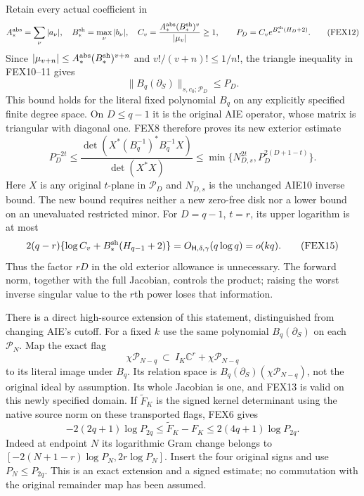 \documentclass[11pt,a4paper]{article}
\begin{document}
Retain every actual coefficient in
\[
 A_*^{\rm abs}=\sum_\nu|a_\nu|,\quad B_*^{\rm sh}=\max_\nu|b_\nu|,
 \quad C_v=\frac{A_*^{\rm abs}(B_*^{\rm sh})^v}{|\mu_v|}\ge1,
 \qquad P_D=C_v e^{B_*^{\rm sh}(H_D+2)}.
 \tag{FEX12}
\]
Since $|\mu_{v+n}|\le A_*^{\rm abs}(B_*^{\rm sh})^{v+n}$ and
$v!/(v+n)!\le1/n!$, the triangle inequality in FEX10--11 gives
\[
 \|B_q(\partial_S)\|_{s,c_0;\mathcal P_D}\le P_D.
 \tag{FEX13}
\]
This bound holds for the literal fixed polynomial $B_q$ on any explicitly
specified finite degree space. On $D\le q-1$ it is the original AIE
operator, whose matrix is triangular with diagonal one. FEX8 therefore
proves its new exterior estimate
\[
\boxed{\quad
 P_D^{-2t}\le
 \frac{\det(X^*(B_q^{-1})^*B_q^{-1}X)}{\det(X^*X)}
 \le \min\{N_{D,s}^{2t},P_D^{2(D+1-t)}\}.
 \quad}\tag{FEX14}
\]
Here $X$ is any original $t$-plane in $\mathcal P_D$ and $N_{D,s}$ is the
unchanged AIE10 inverse bound. The new bound requires neither a new
zero-free disk nor a lower bound on an unevaluated restricted minor.
For $D=q-1$, $t=r$, its upper logarithm is at most
\[
 2(q-r)\{\log C_v+B_*^{\rm sh}(H_{q-1}+2)\}
       =O_{\mathsf H,\delta,\gamma}(q\log q)=o(kq).
 \tag{FEX15}
\]
Thus the factor $rD$ in the old exterior allowance is unnecessary. The
forward norm, together with the full Jacobian, controls the product;
raising the worst inverse singular value to the $r$th power loses that
information.

There is a direct high-source extension of this statement, distinguished
from changing AIE's cutoff. For a fixed $k$ use the same polynomial
$B_q(\partial_S)$ on each $\mathcal P_N$. Map the exact flag
\[
 \chi\mathcal P_{N-q}\ \subset\ I_K\mathbb C^r+\chi\mathcal P_{N-q}
\]
to its literal image under $B_q$. Its relation space is
$B_q(\partial_S)(\chi\mathcal P_{N-q})$, not the original ideal by
assumption. Its whole Jacobian is one, and FEX13 is valid on this newly
specified domain. If $\widetilde F_K$ is the signed kernel determinant
using the native source norm on these transported flags, FEX6 gives
\[
 -2(2q+1)\log P_{2q}\le\widetilde F_K-F_K
              \le2(4q+1)\log P_{2q}.
 \tag{FEX16}
\]
Indeed at endpoint $N$ its logarithmic Gram change belongs to
$[-2(N+1-r)\log P_N,2r\log P_N]$. Insert the four original signs and
use $P_N\le P_{2q}$. This is an exact extension and a signed estimate;
no commutation with the original remainder map has been assumed.
\end{document}
